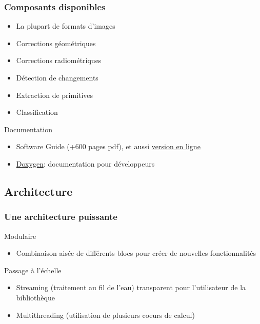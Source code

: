 \documentclass[compress]{beamer}
\begin{document}
\begin{frame}
\frametitle{Composants disponibles}
 \begin{block}{}
\scriptsize
\begin{itemize}
\item La plupart de formats d'images
\item Corrections géométriques
\item Corrections radiométriques
\item Détection de changements
\item Extraction de primitives
\item Classification
\end{itemize}
\end{block}


 \begin{block}{Documentation}
\scriptsize
\begin{itemize}
\item Software Guide (+600 pages pdf), et aussi
  \href{http://www.orfeo-toolbox.org/SoftwareGuide/}{version en ligne}
\item \href{http://www.orfeo-toolbox.org/doxygen}{Doxygen}:
  documentation pour développeurs
\end{itemize}
\end{block}
\end{frame}

\subsection{Architecture}

\begin{frame}
 \frametitle{Une architecture puissante}
  \begin{block}{Modulaire}
\scriptsize
\begin{itemize}
\item Combinaison aisée de différents blocs pour créer de nouvelles fonctionnalités
\end{itemize}
\end{block}
  \begin{block}{Passage à l'échelle}
\scriptsize
\begin{itemize}
\item Streaming (traitement au fil de l'eau) transparent pour
  l'utilisateur de la bibliothèque
\item Multithreading (utilisation de plusieurs coeurs de calcul) 
\end{itemize}
\end{block}
\end{frame}
\end{document}

